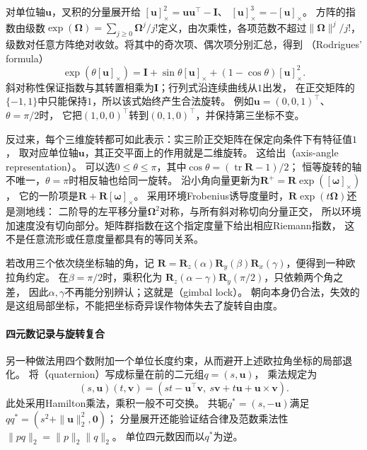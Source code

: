 对单位轴$\bm u$，叉积的分量展开给
$[\bm u]_\times^2=\bm u\bm u^\top-\bm I$、
$[\bm u]_\times^3=-[\bm u]_\times$。
方阵的指数由级数$\exp(\bm\Omega)=\sum_{j\geq0}\bm\Omega^j/j!$定义，由次乘性，各项范数不超过$\lVert\bm\Omega\rVert^j/j!$，级数对任意方阵绝对收敛。将其中的奇次项、偶次项分别汇总，得到
（Rodrigues' formula）
\begin{equation}
 \exp(\theta[\bm u]_\times)
 =\bm I+\sin\theta[\bm u]_\times+(1-\cos\theta)[\bm u]_\times^2.
 \label{eq:geometry-rodrigues}
\end{equation}
斜对称性保证指数与其转置相乘为$\bm I$；行列式沿连续曲线从$1$出发，
在正交矩阵的$\{-1,1\}$中只能保持$1$，所以该式始终产生合法旋转。
例如$\bm u=(0,0,1)^\top$、$\theta=\pi/2$时，
它把$(1,0,0)^\top$转到$(0,1,0)^\top$，并保持第三坐标不变。

反过来，每个三维旋转都可如此表示：实三阶正交矩阵在保定向条件下有特征值$1$，
取对应单位轴$\bm u$，其正交平面上的作用就是二维旋转。
这给出（axis-angle representation）。
可以选$0\leq\theta\leq\pi$，其中$\cos\theta=(\operatorname{tr}\bm R-1)/2$；
恒等旋转的轴不唯一，$\theta=\pi$时相反轴也给同一旋转。
沿小角向量更新为$\bm R^+=\bm R\exp([\bm\omega]_\times)$，
它的一阶项是$\bm R+\bm R[\bm\omega]_\times$。
采用环境Frobenius诱导度量时，$\bm R\exp(t\bm\Omega)$还是测地线：
二阶导的左平移分量$\bm\Omega^2$对称，与所有斜对称切向分量正交，
所以环境加速度没有切向部分。矩阵群指数在这个指定度量下给出相应Riemann指数，
这不是任意流形或任意度量都具有的等同关系。

若改用三个依次绕坐标轴的角，记
$\bm R=\bm R_z(\alpha)\bm R_y(\beta)\bm R_x(\gamma)$，便得到一种欧拉角约定。
在$\beta=\pi/2$时，乘积化为
$\bm R_z(\alpha-\gamma)\bm R_y(\pi/2)$，只依赖两个角之差，
因此$\alpha,\gamma$不再能分别辨认；这就是（gimbal lock）。
朝向本身仍合法，失效的是这组局部坐标，不能把坐标奇异误作物体失去了旋转自由度。

\paragraph{四元数记录与旋转复合}
另一种做法用四个数附加一个单位长度约束，从而避开上述欧拉角坐标的局部退化。
将（quaternion）写成标量在前的二元组$q=(s,\bm u)$，
乘法规定为
\[
 (s,\bm u)(t,\bm v)
 =(st-\bm u^\top\bm v,\ s\bm v+t\bm u+\bm u\times\bm v).
\]
此处采用Hamilton乘法，乘积一般不可交换。
共轭$q^*=(s,-\bm u)$满足$qq^*=(s^2+\|\bm u\|_2^2,\bm0)$；
分量展开还能验证结合律及范数乘法性$\|pq\|_2=\|p\|_2\|q\|_2$。
单位四元数因而以$q^*$为逆。

